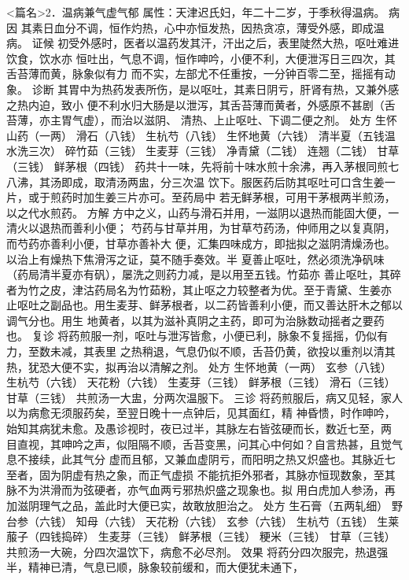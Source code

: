 \documentclass[a4paper,12pt,UTF8,twoside]{ctexbook}
\begin{document}
<篇名>2．温病兼气虚气郁
属性：天津迟氏妇，年二十二岁，于季秋得温病。 
病因 其素日血分不调，恒作灼热，心中亦恒发热，因热贪凉，薄受外感，即成温病。 
证候 初受外感时，医者以温药发其汗，汗出之后，表里陡然大热，呕吐难进饮食，饮水亦 
恒吐出，气息不调，恒作呻吟，小便不利，大便泄泻日三四次，其舌苔薄而黄，脉象似有力 
而不实，左部尤不任重按，一分钟百零二至，摇摇有动象。 
诊断 其胃中为热药发表所伤，是以呕吐，其素日阴亏，肝肾有热，又兼外感之热内迫，致小 
便不利水归大肠是以泄泻，其舌苔薄而黄者，外感原不甚剧（舌苔薄，亦主胃气虚），而治以滋阴、 
清热、上止呕吐、下调二便之剂。 
处方 生怀山药（一两） 滑石（八钱） 生杭芍（八钱） 生怀地黄（六钱） 
清半夏（五钱温水洗三次） 碎竹茹（三钱） 生麦芽（三钱） 净青黛（二钱） 
连翘（二钱） 甘草（三钱） 鲜茅根（四钱） 
药共十一味，先将前十味水煎十余沸，再入茅根同煎七八沸，其汤即成，取清汤两盅，分三次温 
饮下。服医药后防其呕吐可口含生姜一片，或于煎药时加生姜三片亦可。至药局中 
若无鲜茅根，可用干茅根两半煎汤，以之代水煎药。 
方解 方中之义，山药与滑石并用，一滋阴以退热而能固大便，一清火以退热而善利小便； 
芍药与甘草并用，为甘草芍药汤，仲师用之以复真阴，而芍药亦善利小便，甘草亦善补大 
便，汇集四味成方，即拙拟之滋阴清燥汤也。以治上有燥热下焦滑泻之证，莫不随手奏效。半 
夏善止呕吐，然必须洗净矾味（药局清半夏亦有矾），屡洗之则药力减，是以用至五钱。竹茹亦 
善止呕吐，其碎者为竹之皮，津沽药局名为竹茹粉，其止呕之力较整者为优。至于青黛、生姜亦 
止呕吐之副品也。用生麦芽、鲜茅根者，以二药皆善利小便，而又善达肝木之郁以调气分也。用生 
地黄者，以其为滋补真阴之主药，即可为治脉数动摇者之要药也。 
复诊 将药煎服一剂，呕吐与泄泻皆愈，小便已利，脉象不复摇摇，仍似有力，至数未减，其表里 
之热稍退，气息仍似不顺，舌苔仍黄，欲投以重剂以清其热，犹恐大便不实，拟再治以清解之剂。 
处方 生怀地黄（一两） 玄参（八钱） 生杭芍（六钱） 天花粉（六钱） 
生麦芽（三钱） 鲜茅根（三钱） 滑石（三钱） 甘草（三钱） 
共煎汤一大盅，分两次温服下。 
三诊 将药煎服后，病又见轻，家人以为病愈无须服药矣，至翌日晚十一点钟后，见其面红，精 
神昏愦，时作呻吟，始知其病犹未愈。及愚诊视时，夜已过半，其脉左右皆弦硬而长，数近七至，两 
目直视，其呻吟之声，似阻隔不顺，舌苔变黑，问其心中何如？自言热甚，且觉气息不接续，此其气分 
虚而且郁，又兼血虚阴亏，而阳明之热又炽盛也。其脉近七至者，固为阴虚有热之象，而正气虚损 
不能抗拒外邪者，其脉亦恒现数象，至其脉不为洪滑而为弦硬者，亦气血两亏邪热炽盛之现象也。拟 
用白虎加人参汤，再加滋阴理气之品，盖此时大便已实，故敢放胆治之。 
处方 生石膏（五两轧细） 野台参（六钱） 知母（六钱） 天花粉（六钱） 
玄参（六钱） 生杭芍（五钱） 生莱菔子（四钱捣碎） 生麦芽（三钱） 
鲜茅根（三钱） 粳米（三钱） 甘草（三钱） 
共煎汤一大碗，分四次温饮下，病愈不必尽剂。 
效果 将药分四次服完，热退强半，精神已清，气息已顺，脉象较前缓和，而大便犹未通下， 
\end{document}

